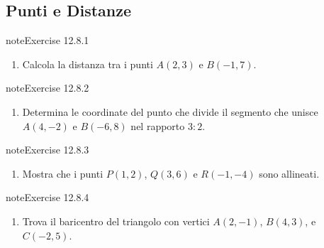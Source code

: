 \documentclass[letterpaper,10pt,italian]{jupyterBook}
\begin{document}
\subsection{Punti e Distanze}
\label{\detokenize{ch/analytic_geometry/analytic_geometry_2d/sol:punti-e-distanze}} \label{exercise:ch/analytic_geometry/analytic_geometry_2d/sol-exercise-0}

\begin{sphinxadmonition}{note}{Exercise 12.8.1}


\begin{enumerate}
%
\item {} 
\sphinxAtStartPar
Calcola la distanza tra i punti \( A(2, 3) \) e \( B(-1, 7) \).

\end{enumerate}
\end{sphinxadmonition}
 \label{exercise:ch/analytic_geometry/analytic_geometry_2d/sol-exercise-1}

\begin{sphinxadmonition}{note}{Exercise 12.8.2}


\begin{enumerate}
%
\setcounter{enumi}{1}
\item {} 
\sphinxAtStartPar
Determina le coordinate del punto che divide il segmento che unisce \( A(4, -2) \) e \( B(-6, 8) \) nel rapporto \( 3:2 \).

\end{enumerate}
\end{sphinxadmonition}
 \label{exercise:ch/analytic_geometry/analytic_geometry_2d/sol-exercise-2}

\begin{sphinxadmonition}{note}{Exercise 12.8.3}


\begin{enumerate}
%
\setcounter{enumi}{2}
\item {} 
\sphinxAtStartPar
Mostra che i punti \( P(1, 2) \), \( Q(3, 6) \) e \( R(-1, -4) \) sono allineati.

\end{enumerate}
\end{sphinxadmonition}
 \label{exercise:ch/analytic_geometry/analytic_geometry_2d/sol-exercise-3}

\begin{sphinxadmonition}{note}{Exercise 12.8.4}


\begin{enumerate}
%
\setcounter{enumi}{3}
\item {} 
\sphinxAtStartPar
Trova il baricentro del triangolo con vertici \( A(2, -1) \), \( B(4, 3) \), e \( C(-2, 5) \).

\end{enumerate}
\end{sphinxadmonition}
 \label{exercise:ch/analytic_geometry/analytic_geometry_2d/sol-exercise-4}
\end{document}
